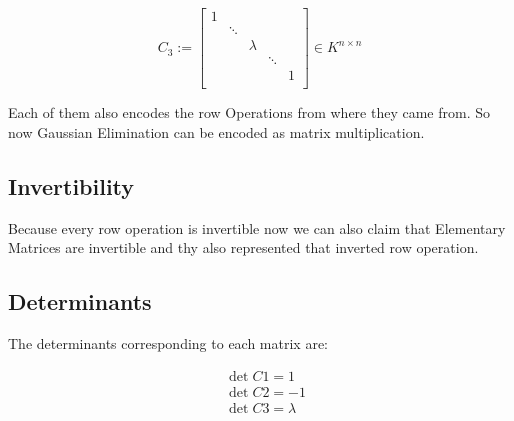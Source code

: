 \[
       C_3 := 
       \begin{bmatrix}
       1      &        &        &        &        \\
              & \ddots &        &        &        \\
              &        & \lambda &       &        \\
              &        &        & \ddots &        \\
              &        &        &        & 1      \\
       \end{bmatrix}
       \in K^{n \times n}
\]

Each of them also encodes the row Operations from where they came from.
So now Gaussian Elimination can be encoded as matrix multiplication.

\subsection{Invertibility}

Because every row operation is invertible now we can also claim that
Elementary Matrices are invertible and thy also represented that inverted row operation.

\subsection{Determinants}

The determinants corresponding to each matrix are:

\begin{align*}
&\det C1 = 1\\
&\det C2 = -1\\
&\det C3 = \lambda
\end{align*}

